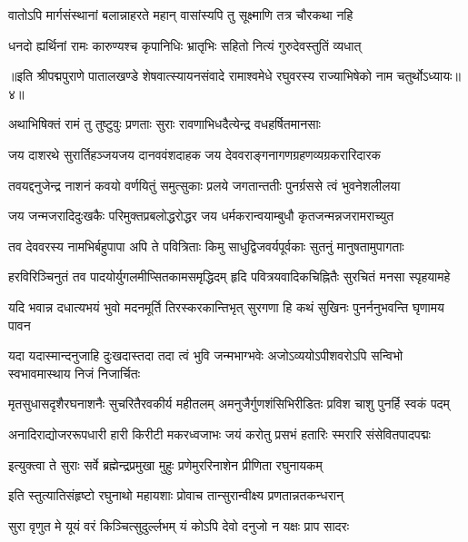 \twolineshloka
{वातोऽपि मार्गसंस्थानां बलान्नाहरते महान्}
{वासांस्यपि तु सूक्ष्माणि तत्र चौरकथा नहि}%

\twolineshloka
{धनदो ह्यर्थिनां रामः कारुण्यश्च कृपानिधिः}
{भ्रातृभिः सहितो नित्यं गुरुदेवस्तुतिं व्यधात्}%

॥इति श्रीपद्मपुराणे पातालखण्डे शेषवात्स्यायनसंवादे रामाश्वमेधे रघुवरस्य राज्याभिषेको नाम चतुर्थोऽध्यायः॥४॥



\twolineshloka
{अथाभिषिक्तं रामं तु तुष्टुवुः प्रणताः सुराः}
{रावणाभिधदैत्येन्द्र वधहर्षितमानसाः}%


\twolineshloka
{जय दाशरथे सुरार्तिहञ्जयजय दानववंशदाहक}
{जय देववराङ्गनागणग्रहणव्यग्रकरारिदारक}%

\twolineshloka
{तवयद्दनुजेन्द्र नाशनं कवयो वर्णयितुं समुत्सुकाः}
{प्रलये जगतान्ततीः पुनर्ग्रससे त्वं भुवनेशलीलया}%

\twolineshloka
{जय जन्मजरादिदुःखकैः परिमुक्तप्रबलोद्धरोद्धर}
{जय धर्मकरान्वयाम्बुधौ कृतजन्मन्नजरामराच्युत}%

\twolineshloka
{तव देववरस्य नामभिर्बहुपापा अपि ते पवित्रिताः}
{किमु साधुद्विजवर्यपूर्वकाः सुतनुं मानुषतामुपागताः}%

\twolineshloka
{हरविरिञ्चिनुतं तव पादयोर्युगलमीप्सितकामसमृद्धिदम्}
{हृदि पवित्रयवादिकचिह्नितैः सुरचितं मनसा स्पृहयामहे}%

\twolineshloka
{यदि भवान्न दधात्यभयं भुवो मदनमूर्ति तिरस्करकान्तिभृत्}
{सुरगणा हि कथं सुखिनः पुनर्ननुभवन्ति घृणामय पावन}%

\twolineshloka
{यदा यदास्मान्दनुजाहि दुःखदास्तदा तदा त्वं भुवि जन्मभाग्भवेः}
{अजोऽव्ययोऽपीशवरोऽपि सन्विभो स्वभावमास्थाय निजं निजार्चितः}%

\twolineshloka
{मृतसुधासदृशैरघनाशनैः सुचरितैरवकीर्य महीतलम्}
{अमनुजैर्गुणशंसिभिरीडितः प्रविश चाशु पुनर्हि स्वकं पदम्}%

\twolineshloka
{अनादिराद्योजररूपधारी हारी किरीटी मकरध्वजाभः}
{जयं करोतु प्रसभं हतारिः स्मरारि संसेवितपादपद्मः}%

\twolineshloka
{इत्युक्त्वा ते सुराः सर्वे ब्रह्मेन्द्रप्रमुखा मुहुः}
{प्रणेमुररिनाशेन प्रीणिता रघुनायकम्}%

\twolineshloka
{इति स्तुत्यातिसंहृष्टो रघुनाथो महायशाः}
{प्रोवाच तान्सुरान्वीक्ष्य प्रणतान्नतकन्धरान्}%


\twolineshloka
{सुरा वृणुत मे यूयं वरं किञ्चित्सुदुर्ल्लभम्}
{यं कोऽपि देवो दनुजो न यक्षः प्राप सादरः}%

